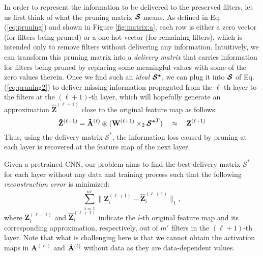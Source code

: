 In order to represent the information to be delivered to the preserved filters, let us first think of what the pruning matrix $\boldsymbol{\S}$ means. As defined in Eq. (\ref{eq:pruning}) and shown in Figure \ref{fig:matrix:a}, each row is either a zero vector (for filters being pruned) or a one-hot vector (for remaining filters), which is intended only to remove filters without delivering any information. Intuitively, we can transform this pruning matrix into a \textit{delivery matrix} that carries information for filters being pruned by replacing some meaningful values with some of the zero values therein. Once we find such an \textit{ideal} $\boldsymbol{\S^*}$, we can plug it into $\boldsymbol{\S}$ of Eq. (\ref{eq:pruning2}) to deliver missing information propagated from the $\ell$-th layer to the filters at the $(\ell+1)$-th layer, which will hopefully generate an approximation $\mathbf{\hat{Z}}^{(\ell+1)}$ close to the original feature map as follows:
\begin{equation} \label{eq:fmap_approx}
{\mathbf{\hat{Z}}}^{{(\ell+1)}} = {\mathbf{\Tilde{A}}^{(\ell)} \circledast ({\mathbf{W}}^{(\ell+1)} \times_{2} {\boldsymbol{\S^*}^T})}
~~~\approx~~~\mathbf{Z}^{(\ell+1)}
\end{equation}
Thus, using the delivery matrix $\boldsymbol{\mathcal{S^*}}$, the information loss caused by pruning at each layer is recovered at the feature map of the next layer. 

Given a pretrained CNN, our problem aims to find the best delivery matrix $\boldsymbol{\mathcal{S^*}}$ for each layer without any data and training process such that the following \textit{reconstruction error} is minimized:
\begin{equation}
\sum\limits_{i = 1}^{m'}\|{{\mathbf{Z}}_{i}^{{(\ell+1)}}-{\hat{\mathbf{Z}}}_{i}^{{(\ell+1)}}}\|_1,
\label{eq:goal}
\end{equation}
where ${\mathbf{Z}}_i^{{(\ell+1)}}$ and ${\hat{\mathbf{Z}}}_i^{{(\ell+1)}}$ indicate the $i$-th original feature map and its corresponding approximation, respectively, out of $m'$ filters in the $(\ell+1)$-th layer. Note that what is challenging here is that we cannot obtain the activation maps in $\mathbf{A}^{(\ell)}$ and $\mathbf{\Tilde{A}}^{(\ell)}$ without data as they are data-dependent values.

